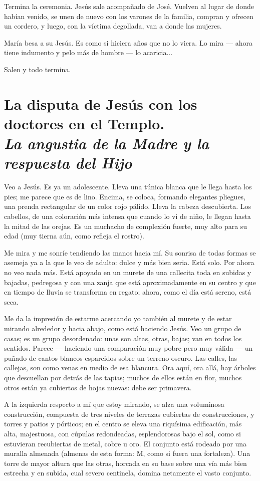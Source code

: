 \documentclass[12pt, twoside, openright]{book} %
\begin{document}
Termina la ceremonia. Jesús sale acompañado de José. Vuelven al lugar de donde habían venido, se unen de nuevo con los varones de la familia, compran y ofrecen un cordero, y luego, con la víctima degollada, van a donde las mujeres. 

María besa a su Jesús. Es como si hiciera años que no lo viera. Lo mira — ahora tiene indumento y pelo más de hombre — lo acaricia... 

Salen y todo termina. 

\chapter*{La disputa de Jesús con los doctores en el Templo. \\ \normalfont\normalsize\textit{La angustia de la Madre y la respuesta del Hijo}}
 
Veo a Jesús. Es ya un adolescente. Lleva una túnica blanca que le llega hasta los pies; me parece que es de lino. Encima, se coloca, formando elegantes pliegues, una prenda rectangular de un color rojo pálido. Lleva la cabeza descubierta. Los cabellos, de una coloración más intensa que cuando lo vi de niño, le llegan hasta la mitad de las orejas. Es un muchacho de complexión fuerte, muy alto para su edad (muy tierna aún, como refleja el rostro). 

Me mira y me sonríe tendiendo las manos hacia mí. Su sonrisa de todas formas se asemeja ya a la que le veo de adulto: dulce y más bien seria. Está solo. Por ahora no veo nada más. Está apoyado en un murete de una callecita toda en subidas y bajadas, pedregosa y con una zanja que está aproximadamente en su centro y que en tiempo de lluvia se transforma en regato; ahora, como el día está sereno, está seca. 

Me da la impresión de estarme acercando yo también al murete y de estar mirando alrededor y hacia abajo, como está haciendo Jesús. Veo un grupo de casas; es un grupo desordenado: unas son altas, otras, bajas; van en todos los sentidos. Parece — haciendo una comparación muy pobre pero muy válida — un puñado de cantos blancos esparcidos sobre un terreno oscuro. Las calles, las callejas, son como venas en medio de esa blancura. Ora aquí, ora allá, hay árboles que descuellan por detrás de las tapias; muchos de ellos están en flor, muchos otros están ya cubiertos de hojas nuevas: debe ser primavera. 

A la izquierda respecto a mí que estoy mirando, se alza una voluminosa construcción, compuesta de tres niveles de terrazas cubiertas de construcciones, y torres y patios y pórticos; en el centro se eleva una riquísima edificación, más alta, majestuosa, con cúpulas redondeadas, esplendorosas bajo el sol, como si estuvieran recubiertas de metal, cobre u oro. El conjunto está rodeado por una muralla almenada (almenas de esta forma: M, como si fuera una fortaleza). Una torre de mayor altura que las otras, horcada en su base sobre una vía más bien estrecha y en subida, cual severo centinela, domina netamente el vasto conjunto. 
\end{document}

